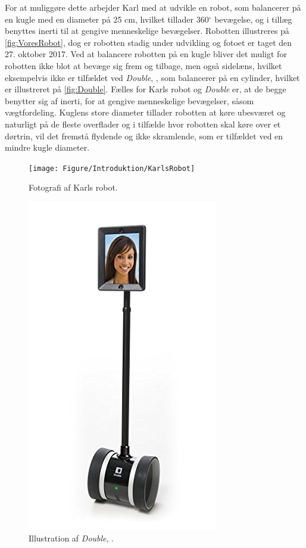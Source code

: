 For at muliggøre dette arbejder Karl med at udvikle en robot, som balancerer på en kugle med en diameter på 25 cm, hvilket tillader 360$^{\circ}$ bevægelse, og i tillæg benyttes inerti til at gengive menneskelige bevægelser. Robotten illustreres på \autoref{fig:VoresRobot}, dog er robotten stadig under udvikling og fotoet er taget den 27. oktober 2017. Ved at balancere robotten på en kugle bliver det muligt for robotten ikke blot at bevæge sig frem og tilbage, men også sidelæns, hvilket eksempelvis ikke er tilfældet ved \textit{Double}, \parencite{WEB:Double}, som balancerer på en cylinder, hvilket er illustreret på \autoref{fig:Double}. Fælles for Karls robot og \textit{Double} er, at de begge benytter sig af inerti, for at gengive menneskelige bevægelser, såsom vægtfordeling. Kuglens store diameter tillader robotten at køre ubesværet og naturligt på de fleste overflader og i tilfælde hvor robotten skal køre over et dørtrin, vil det fremstå flydende og ikke skramlende, som er tilfældet ved en mindre kugle diameter. 
%
\begin{figure}[H]
\centering
\begin{minipage}{.5\textwidth}
  \centering
  \texttt{[image: Figure/Introduktion/KarlsRobot]}
  \caption{Fotografi af Karls robot.}
  \label{fig:VoresRobot}
\end{minipage}%
\begin{minipage}{.5\textwidth}
  \centering
  \includegraphics[width=.775\linewidth]{Figure/Introduktion/Double}
  \caption{Illustration af \textit{Double}, \parencite{WEB:Double}.}
  \label{fig:Double}
\end{minipage}
\end{figure}
